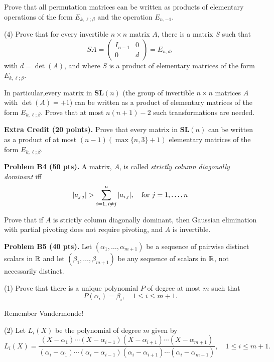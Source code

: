 \documentclass[12pt]{article}
\begin{document}
\medskip
Prove that all permutation matrices can be written as products
of elementary operations of the form  $E_{k,\ell; \beta}$ 
and the operation $E_{n, -1}$.

\medskip
(4)
Prove that for every invertible $n\times n$ matrix $A$, there is
a matrix $S$ such that
\[
S A = 
\begin{pmatrix}
I_{n - 1} & 0 \\
0 & d
\end{pmatrix}
= E_{n, d},
\]
with $d = \det(A)$, and where $S$ is a product of elementary 
matrices of the form  $E_{k,\ell; \beta}$.

\medskip
In particular,every matrix in $\mathbf{SL}(n)$
(the group of invertible $n\times n$ matrices $A$ with
$\det(A) = +1$) can be written as a product of
elementary 
matrices of the form  $E_{k,\ell; \beta}$.
Prove that at most $n(n + 1) - 2$ such transformations are needed.

\vspace {0.25cm}\noindent
{\bf Extra Credit (20 points).}
Prove that every matrix in $\mathbf{SL}(n)$
can be written as a product of at most
$(n  - 1)(\max\{n, 3\} + 1)$
elementary   matrices of the form  $E_{k,\ell; \beta}$.


\vspace {0.25cm}\noindent
{\bf Problem B4 (50 pts).}
A matrix, $A$, is called {\it strictly column diagonally dominant\/}
iff
\[
|a_{j\, j}| > \sum_{i = 1,\, i\not= j}^{n} |a_{i\, j}|,
\quad\hbox{for $j = 1, \ldots, n$}
\]

Prove that if $A$ is  strictly column diagonally dominant, then
Gaussian elimination with partial pivoting does not require pivoting, and 
$A$ is invertible.



\vspace {0.25cm}\noindent
{\bf Problem B5 (40 pts).}
Let $(\alpha_1, \ldots, \alpha_{m + 1})$ be a sequence of pairwise distinct
scalars in ${\mathbb R}$ and let $(\beta_1, \ldots, \beta_{m + 1})$ be any 
sequence of scalars in ${\mathbb R}$, not necessarily distinct.

\medskip
(1)
Prove that there is a unique polynomial $P$ of degree at most $m$
such that
\[
P(\alpha_i) = \beta_i, \quad 1\leq i \leq m + 1. 
\]

\medskip
\hint
Remember Vandermonde!

\medskip
(2)
Let $L_i(X)$ be the polynomial of degree $m$ given by
\[
L_i(X) = \frac{(X - \alpha_1)\cdots (X - \alpha_{i - 1}) (X - \alpha_{i + 1})
\cdots (X - \alpha_{m + 1})}
  {(\alpha_i - \alpha_1)\cdots (\alpha_i - \alpha_{i - 1}) 
(\alpha_i - \alpha_{i + 1}) \cdots (\alpha_i - \alpha_{m + 1})},
\quad 1 \leq i \leq m + 1.
\]
\end{document}
